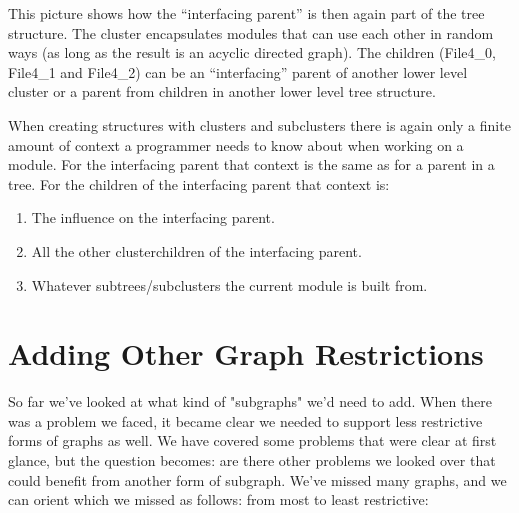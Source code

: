 \documentclass{article}
\begin{document}
This picture shows how the “interfacing parent” is then again part of the tree structure. The cluster encapsulates modules that can use each other in random ways (as long as the result is an acyclic directed graph). The children (File4\_0, File4\_1 and File4\_2) can be an “interfacing” parent of another lower level cluster or a parent from children in another lower level tree structure.

When creating structures with clusters and subclusters there is again only a finite amount of context a programmer needs to know about when working on a module. For the interfacing parent that context is the same as for a parent in a tree. For the children of the interfacing parent that context is:

\begin{enumerate}
    \item The influence on the interfacing parent.
    \item All the other clusterchildren of the interfacing parent.
    \item Whatever subtrees/subclusters the current module is built from.
\end{enumerate}


\section{Adding Other Graph Restrictions}

So far we've looked at what kind of "subgraphs" we'd need to add. When there was a problem we faced, it became clear we needed to support less restrictive forms of graphs as well. We have covered some problems that were clear at first glance, but the question becomes: are there other problems we looked over that could benefit from another form of subgraph. We've missed many graphs, and we can orient which we missed as follows:
from most to least restrictive:
\end{document}

